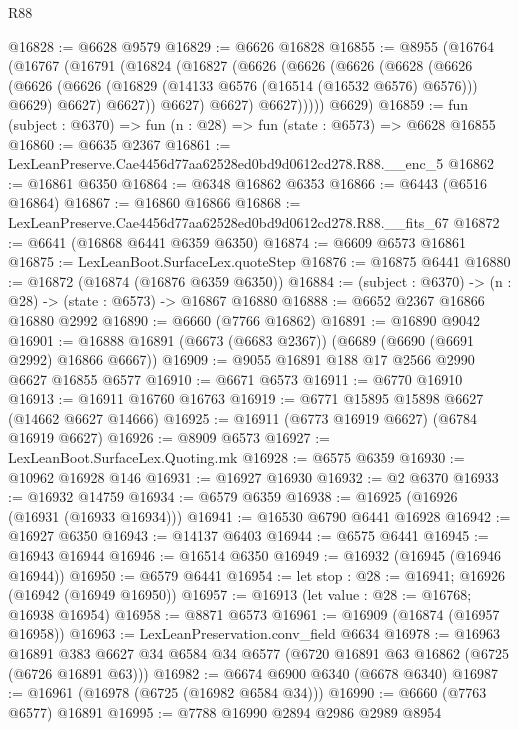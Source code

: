 \begin{lexlean}{R88}
\begin{coremodule}
@16828 := @6628 @9579
@16829 := @6626 @16828
@16855 := @8955
    (@16764
      (@16767
        (@16791
          (@16824
            (@16827
              (@6626
                (@6626
                  (@6626
                    (@6628
                      (@6626
                        (@6626
                          (@6626 (@16829 (@14133 @6576 (@16514 (@16532 @6576) @6576))) @6629)
                          @6627)
                        @6627))
                    @6627)
                  @6627)
                @6627)))))
      @6629)
@16859 := fun (subject : @6370) => fun (n : @28) => fun (state : @6573) => @6628 @16855
@16860 := @6635 @2367
@16861 := LexLeanPreserve.Cae4456d77aa62528ed0bd9d0612cd278.R88.__enc_5
@16862 := @16861 @6350
@16864 := @6348 @16862 @6353
@16866 := @6443 (@6516 @16864)
@16867 := @16860 @16866
@16868 := LexLeanPreserve.Cae4456d77aa62528ed0bd9d0612cd278.R88.__fits_67
@16872 := @6641 (@16868 @6441 @6359 @6350)
@16874 := @6609 @6573 @16861
@16875 := LexLeanBoot.SurfaceLex.quoteStep
@16876 := @16875 @6441
@16880 := @16872 (@16874 (@16876 @6359 @6350))
@16884 := (subject : @6370) -> (n : @28) -> (state : @6573) -> @16867 @16880
@16888 := @6652 @2367 @16866 @16880 @2992
@16890 := @6660 (@7766 @16862)
@16891 := @16890 @9042
@16901 := @16888 @16891 (@6673 (@6683 @2367)) (@6689 (@6690 (@6691 @2992) @16866 @6667))
@16909 := @9055 @16891 @188 @17 @2566 @2990 @6627 @16855 @6577
@16910 := @6671 @6573
@16911 := @6770 @16910
@16913 := @16911 @16760 @16763
@16919 := @6771 @15895 @15898 @6627 (@14662 @6627 @14666)
@16925 := @16911 (@6773 @16919 @6627) (@6784 @16919 @6627)
@16926 := @8909 @6573
@16927 := LexLeanBoot.SurfaceLex.Quoting.mk
@16928 := @6575 @6359
@16930 := @10962 @16928 @146
@16931 := @16927 @16930
@16932 := @2 @6370
@16933 := @16932 @14759
@16934 := @6579 @6359
@16938 := @16925 (@16926 (@16931 (@16933 @16934)))
@16941 := @16530 @6790 @6441 @16928
@16942 := @16927 @6350
@16943 := @14137 @6403
@16944 := @6575 @6441
@16945 := @16943 @16944
@16946 := @16514 @6350
@16949 := @16932 (@16945 (@16946 @16944))
@16950 := @6579 @6441
@16954 := let stop : @28 := @16941; @16926 (@16942 (@16949 @16950))
@16957 := @16913 (let value : @28 := @16768; @16938 @16954)
@16958 := @8871 @6573
@16961 := @16909 (@16874 (@16957 @16958))
@16963 := LexLeanPreservation.conv_field @6634
@16978 := @16963
    @16891
    @383
    @6627
    @34
    @6584
    @34
    @6577
    (@6720 @16891 @63 @16862 (@6725 (@6726 @16891 @63)))
@16982 := @6674 @6900 @6340 (@6678 @6340)
@16987 := @16961 (@16978 (@6725 (@16982 @6584 @34)))
@16990 := @6660 (@7763 @6577) @16891
@16995 := @7788 @16990 @2894 @2986 @2989 @8954

\end{coremodule}
\end{lexlean}

